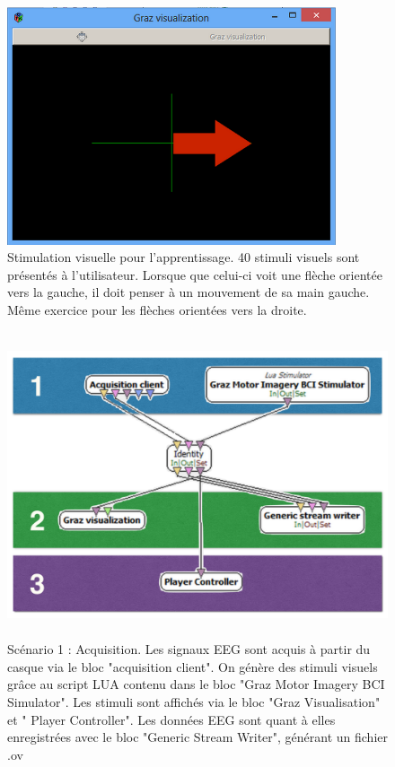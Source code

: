 \begin{figure}[h]
	\centering\includegraphics[height=7cm]{images/exempleAcquisition.png}
	\caption[Stimulation visuelle pour l'apprentissage.]{Stimulation visuelle pour l'apprentissage. 40 stimuli visuels sont présentés à l'utilisateur. Lorsque que celui-ci voit une flèche orientée vers la gauche, il doit penser à un mouvement de sa main gauche. Même exercice pour les flèches orientées vers la droite.}
	\label{acqui}
\end{figure}

\begin{figure}[h]
	\centering\includegraphics[height=9cm]{images/scenario1.png}
	\caption[Scénario 1 : Acquisition.]{Scénario 1 : Acquisition. Les signaux EEG sont acquis à partir du casque via le bloc "acquisition client". On génère des stimuli visuels grâce au script LUA contenu dans le bloc "Graz Motor Imagery BCI Simulator". Les stimuli sont affichés via le bloc "Graz Visualisation" et " Player Controller". Les données EEG sont quant à elles enregistrées avec le bloc "Generic Stream Writer", générant un fichier .ov}
	\label{scena1}
\end{figure}





